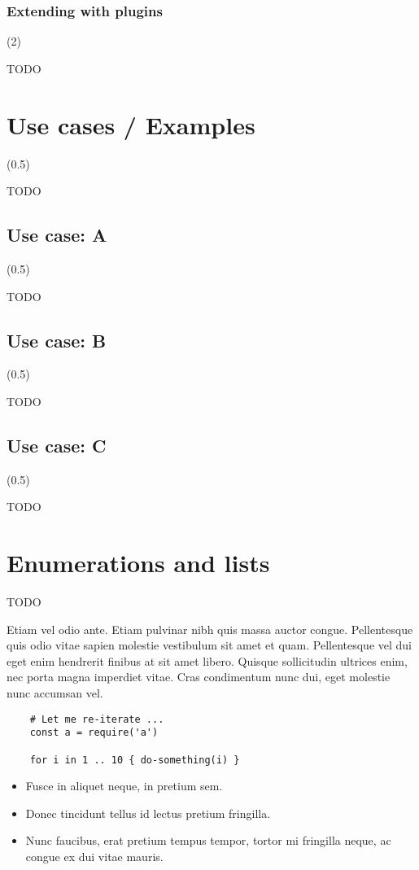 \subsubsection{Extending with plugins} (2)

TODO

\section{Use cases / Examples} (0.5)

TODO

\subsection{Use case: A} (0.5)

TODO

\subsection{Use case: B} (0.5)

TODO

\subsection{Use case: C} (0.5)

TODO

\section{Enumerations and lists}

TODO

Etiam vel odio ante. Etiam pulvinar nibh quis massa auctor congue. Pellentesque quis odio vitae sapien molestie vestibulum sit amet et quam. Pellentesque vel dui eget enim hendrerit finibus at sit amet libero. Quisque sollicitudin ultrices enim, nec porta magna imperdiet vitae. Cras condimentum nunc dui, eget molestie nunc accumsan vel.

\begin{lstlisting}
	# Let me re-iterate ...
	const a = require('a')
			
	for i in 1 .. 10 { do-something(i) }
\end{lstlisting}


\begin{itemize}
	\item Fusce in aliquet neque, in pretium sem.
	\item Donec tincidunt tellus id lectus pretium fringilla.
	\item Nunc faucibus, erat pretium tempus tempor, tortor mi fringilla neque, ac congue ex dui vitae mauris.
\end{itemize}

